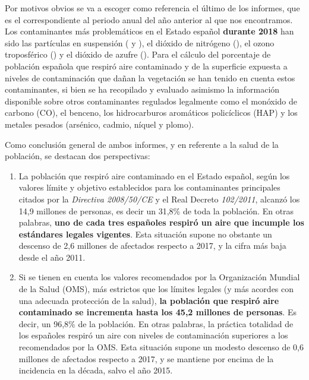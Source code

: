  
 
 Por motivos obvios se va a escoger como referencia el último de los informes, que es el correspondiente al periodo anual del año anterior al que nos encontramos. Los contaminantes más problemáticos en el Estado español \textbf{durante 2018} han sido las partículas en suspensión ( y ), el dióxido de nitrógeno (), el ozono troposférico () y el dióxido de azufre (). Para el cálculo del porcentaje de población española  que respiró aire contaminado y de la superficie expuesta a niveles de contaminación que dañan la vegetación se han tenido en cuenta estos contaminantes, si bien se ha recopilado y evaluado asimismo la información disponible sobre otros contaminantes
 regulados legalmente como el monóxido de carbono (CO), el benceno, los hidrocarburos
 aromáticos policíclicos (HAP) y los metales pesados (arsénico, cadmio, níquel y plomo).
 
 
Como conclusión general de ambos informes, y en referente a la salud de la población, se destacan dos perspectivas:
\begin{enumerate}
	\item La población que respiró aire contaminado en el Estado español, según los valores límite y objetivo establecidos para los contaminantes principales citados por la \textit{Directiva 2008/50/CE} y el Real Decreto \textit{102/2011}, alcanzó los 14,9 millones de personas, es decir un 31,8\% de toda la población. En otras palabras, \textbf{uno de cada tres españoles respiró un aire que incumple los estándares legales vigentes}. Esta situación supone no obstante un descenso de 2,6 millones de afectados respecto a 2017, y la cifra más baja desde el año 2011.
	\item Si se tienen en cuenta los valores recomendados por la Organización Mundial de la Salud (OMS), más estrictos que los límites legales (y más acordes con una adecuada protección	de la salud), \textbf{la población que respiró aire contaminado se incrementa hasta los 45,2 millones de personas}. Es decir, un 96,8\% de la población. En otras palabras, la práctica totalidad de los españoles respiró un aire con niveles de contaminación superiores a los recomendados por la OMS. Esta situación supone un modesto descenso de 0,6 millones de afectados respecto a 2017, y se mantiene por encima de la incidencia en la década, salvo el año 2015.
\end{enumerate}

